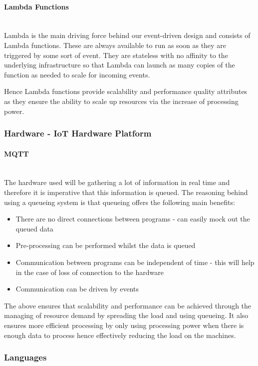 \documentclass{article}
\begin{document}
		\paragraph{Lambda Functions}\mbox{}\\
		Lambda is the main driving force behind our event-driven design and consists of Lambda functions. These are always available to run as soon as they are triggered by some sort of event. They are stateless with no affinity to the underlying infrastructure so that Lambda can launch as many copies of the function as needed to scale for incoming events.
		
		Hence Lambda functions provide scalability and performance quality attributes as they ensure the ability to scale up resources via the increase of processing power.
	\subsubsection{Hardware - IoT Hardware Platform}
		\paragraph{MQTT}\mbox{}\\
		The hardware used will be gathering a lot of information in real time and therefore it is imperative that this information is queued. The reasoning behind using a queueing system is that queueing offers the following main benefits:
		\begin{itemize}
			\item There are no direct connections between programs - can easily mock out the queued data
			\item Pre-processing can be performed whilst the data is queued
			\item Communication between programs can be independent of time - this will help in the case of loss of connection to the hardware
			\item Communication can be driven by events
		\end{itemize}
		
		The above ensures that scalability and performance can be achieved through the managing of resource demand by spreading the load and using queueing. It also ensures more efficient processing by only using processing power when there is enough data to process hence effectively reducing the load on the machines.
	\subsubsection{Languages}
\end{document}
